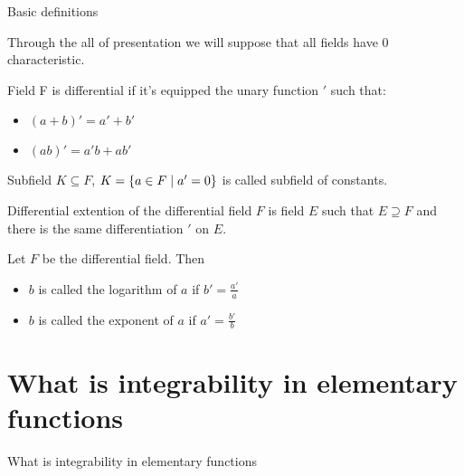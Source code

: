 \documentclass[10pt]{beamer}
\renewcommand{\|}{\ensuremath{\hspace{0.1cm} | \hspace{0.1cm}}}
\begin{document}
    \begin{frame}{Basic definitions}
        \begin{remark}
            Through the all of presentation we will suppose that all fields have 0 characteristic.
        \end{remark}
        \begin{definition}
            Field F is differential if it's equipped the unary function $'$ such that:
            \begin{itemize}
                \item $(a+b)' = a' + b'$
                \item $(ab)' = a'b + ab'$
            \end{itemize}
        \end{definition}
        \begin{definition}
            Subfield $K\subseteq F$, $K = \{ a \in F \| a' = 0 \}$ is called subfield of constants.
        \end{definition}
        \begin{definition}
            Differential extention of the differential field $F$ is field $E$ such that $E\supseteq F$ and there is the same differentiation $'$ on $E$.
        \end{definition}
        \begin{definition}
            Let $F$ be the differential field. Then
            \begin{itemize}
                \item $b$ is called the logarithm of $a$ if $b' = \frac{a'}{a}$
                \item $b$ is called the exponent of $a$ if $a' = \frac{b'}{b}$
            \end{itemize}
        \end{definition}
    \end{frame}
    
    
    

\section{What is integrability in elementary functions}
\begin{frame}{What is integrability in elementary functions}

\end{frame}
\end{document}
